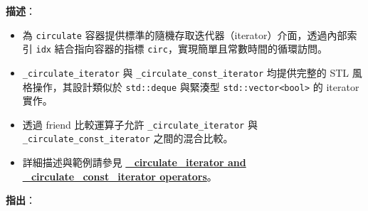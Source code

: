 \documentclass[a4paper,12pt]{article}
\begin{document}
\textbf{描述}：
\begin{itemize}
\item 為 \verb|circulate| 容器提供標準的隨機存取迭代器（iterator）介面，透過內部索引 \verb|idx| 結合指向容器的指標 \verb|circ|，實現簡單且常數時間的循環訪問。
\item \verb|_circulate_iterator| 與 \verb|_circulate_const_iterator| 均提供完整的 STL 風格操作，其設計類似於 \verb|std::deque| 與緊湊型 \verb|std::vector<bool>| 的 iterator 實作。
\item 透過 friend 比較運算子允許 \verb|_circulate_iterator| 與 \verb|_circulate_const_iterator| 之間的混合比較。
\item 詳細描述與範例請參見 \hyperref[circulate-iterator-operators]{\textbf{\_circulate\_iterator and \_circulate\_const\_iterator operators}}。
\end{itemize}
\textbf{指出}：
\end{document}
